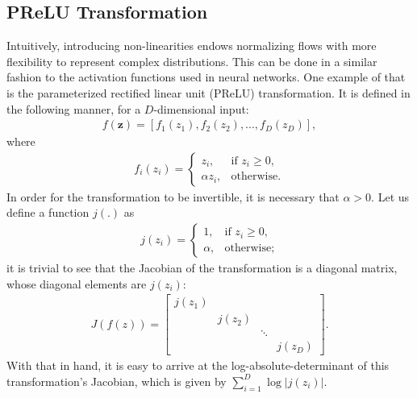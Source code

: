 \subsection{PReLU Transformation}
Intuitively, introducing non-linearities endows normalizing flows with more flexibility to
represent complex distributions. This can be done in a similar fashion to the
activation functions used in neural networks. One example of that is the parameterized
rectified linear unit (PReLU) transformation. It is defined in the following manner, for
a $D$-dimensional input:
\begin{align}
f(\bm{z}) = [f_1(z_1), f_2(z_2), ..., f_D(z_D)],
\end{align} where
\begin{align}
f_i(z_i) =
    \begin{cases}
        z_i,              & \text{if } z_i\geq 0, \\
        \alpha z_i,       & \text{otherwise}.
    \end{cases}
\end{align}
In order for the transformation to be invertible, it is necessary
that $\alpha > 0$.
Let us define a function $j(.)$ as
\begin{align}
j(z_i) =
    \begin{cases}
       1 ,              & \text{if } z_i \geq 0, \\
       \alpha ,       & \text{otherwise};
    \end{cases}
\end{align}
it is trivial to see that the Jacobian of the transformation is a diagonal
matrix, whose diagonal elements are $j(z_i)$:
\begin{align}
  J(f(z)) =
  \begin{bmatrix}
      j(z_1) & & & \\
      & j(z_2) & & \\
      & & \ddots & \\
      & & & j(z_D)
  \end{bmatrix}.
\end{align}
With that in hand, it is easy to arrive at the log-absolute-determinant of this transformation's
Jacobian, which is given by $\sum_{i=1}^D \log \big| j(z_i) \big|$.

